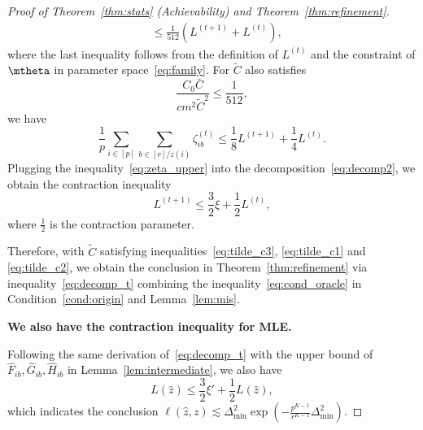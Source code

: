 \documentclass[lettersize,onecolumn,journal]{IEEEtran}
\theoremstyle{definition}
\theoremstyle{definition}
\newcommand{\of}[1]{\left(#1\right)}
\def\fixme#1#2{\textbf{\color{red}[FIXME (#1): #2]}}
\begin{document}
\begin{proof}[Proof of Theorem~\ref{thm:stats} (Achievability) and Theorem~\ref{thm:refinement}]
\begin{align}
         & \leq \frac{1}{512} (L^{(t+1)} + L^{(t)}), \label{eq:g_sum}
    \end{align}
    where the last inequality follows from the definition of $L^{(t)}$ and the constraint of $\mtheta$ in parameter space~\eqref{eq:family}. 
   For $\tilde C$ also satisfies 
    \begin{equation}\label{eq:tilde_c3}
         \frac{C_0 \bar C}{c m^2 \tilde C^2} \leq \frac{1}{512},
    \end{equation}
    we have 
    \begin{equation}\label{eq:zeta_upper}
        \frac{1}{p}\sum_{i \in [p] }  \sum_{b \in [r]/z(i)}  \zeta_{ib}^{(t)} \leq  \frac{1}{8} L^{(t+1)}  + \frac{1}{4} L^{(t)}.
    \end{equation}
    Plugging the inequality~\eqref{eq:zeta_upper} into the decomposition~\eqref{eq:decomp2}, we obtain the contraction inequality 
    \begin{equation}\label{eq:decomp_t}
          L^{(t+1)} \leq \frac{3}{2} \xi  + \frac{1}{2} L^{(t)},
    \end{equation}
     where $\frac{1}{2}$ is the contraction parameter. 
     
     Therefore, with $\tilde C$ satisfying inequalities~\eqref{eq:tilde_c3}, \eqref{eq:tilde_c1} and \eqref{eq:tilde_c2}, we obtain the conclusion in Theorem~\ref{thm:refinement} via inequality~\eqref{eq:decomp_t} combining the inequality~\eqref{eq:cond_oracle} in Condition~\ref{cond:origin} and Lemma~\ref{lem:mis}.
     
     {
       
     \textbf{We also have the contraction inequality for MLE.}
     
     Following the same derivation of~\eqref{eq:decomp_t} with the upper bound of $\hat F_{ib}, \hat G_{ib}, \hat H_{ib}$ in Lemma~\ref{lem:intermediate}, we also have
    \begin{equation}\label{eq:decomp_t}
          L(\hat z) \leq \frac{3}{2} \xi'  + \frac{1}{2} L(\hat z),
    \end{equation}
    which indicates the conclusion $\ell(\hat z,z) \lesssim \Delta_{\min}^2  \exp \of{ - \frac{p^{K-1}}{r^{K-1}} \Delta_{\min}^2  }$.
     }
     
     
    

\end{proof}
\end{document}
